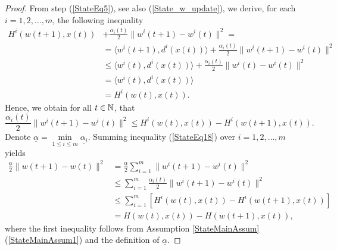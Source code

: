 \begin{proof}
From step (\ref{StateEq5}), see also (\ref{State_w_update}), we derive, for each $i=1,2, \ldots, m$, the following inequality
\begin{align*}
	H^i(w(t+1),x(t)) &+ \frac{\alpha_i(t)}{2} \|w^i(t+1) - w^i(t)\|^2 = \\ 
	&= \langle w^i(t+1) , d^i(x(t)) \rangle + \frac{\alpha_i(t)}{2} \|w^i(t+1) - w^i(t)\|^2 \\
	& \leq \langle w^i(t) , d^i(x(t)) \rangle + \frac{\alpha_i(t)}{2} \|w^i(t) - w^i(t)\|^2 \\
	& = \langle w^i(t) , d^i(x(t)) \rangle \\
	& = H^i(w(t),x(t)) .
\end{align*}
Hence, we obtain for all $t \in \mathbb{N}$, that
\begin{equation}
	\frac{\alpha_i(t)}{2} \|w^i(t+1) - w^i(t)\|^2 
	\leq H^i(w(t),x(t)) - H^i(w(t+1),x(t)) . \label{StateEq18}
\end{equation}
Denote $\underline{\alpha} = \min\limits_{1 \leq i \leq m} \underline{\alpha_i}$. Summing inequality (\ref{StateEq18}) over $i=1, 2, \ldots ,m$ yields
\begin{align}
	\frac{\underline{\alpha}}{2} \|w(t+1) - w(t)\|^2 
	& = \frac{\underline{\alpha}}{2} \sum\limits_{i=1}^{m} \|w^i(t+1) - w^i(t)\|^2 \nonumber \\
	& \leq \sum\limits_{i=1}^{m} \frac{\alpha_i(t)}{2} \|w^i(t+1) - w^i(t)\|^2 \nonumber \\
	& \leq \sum\limits_{i=1}^{m} \left[ H^i(w(t),x(t)) - H^i(w(t+1),x(t)) \right] \nonumber \\
	& = H(w(t),x(t)) - H(w(t+1),x(t)) ,  \label{StateEq16}
\end{align}
where the first inequality follows from Assumption \ref{StateMainAssum}(\ref{StateMainAssum1}) and the definition of $\underline{\alpha}$.


\end{proof}
